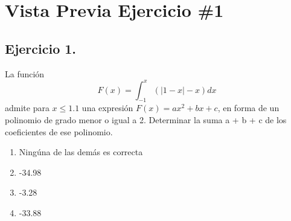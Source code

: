 \documentclass{article}%
\begin{document}
%
\normalsize%
\section*{Vista Previa Ejercicio \#1}%
\subsection*{Ejercicio 1.}%
La función $$F(x)= \int_{-1}^{x}{(|1-x|-x)dx}$$ admite para $x \leq 1.1$ una expresión $F(x)=ax^2+bx + c$, en forma de un polinomio de grado menor o igual a 2. \linebreak 
\linebreak 
Determinar la suma a + b + c de los coeficientes de ese polinomio.%
\begin{enumerate}[label=\alph*)]%
\item%
Ningúna de las demás es correcta%
\item%
-34.98%
\item%
-3.28%
\item%
-33.88%
\end{enumerate}

%
\end{document}
